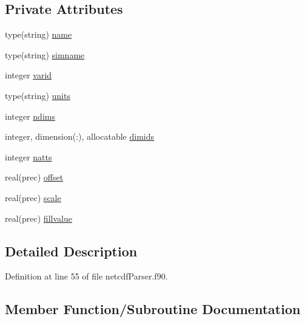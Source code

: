 \subsection*{Private Attributes}
\begin{DoxyCompactItemize}
\item 
type(string) \mbox{\hyperlink{structnetcdfparser__mod_1_1var__t_a86d1bd82de1a8bcd684e0d75cc3d9cc3}{name}}
\item 
type(string) \mbox{\hyperlink{structnetcdfparser__mod_1_1var__t_af5ea209bf909357b775640ad4e9e43d3}{simname}}
\item 
integer \mbox{\hyperlink{structnetcdfparser__mod_1_1var__t_af3b333b148f6159bade3f9263c03892e}{varid}}
\item 
type(string) \mbox{\hyperlink{structnetcdfparser__mod_1_1var__t_ac7b0d52ef17496213c66b5a34dc8f8b6}{units}}
\item 
integer \mbox{\hyperlink{structnetcdfparser__mod_1_1var__t_a1aef5b6886c1e1cbb6714745dfd8d2aa}{ndims}}
\item 
integer, dimension(\+:), allocatable \mbox{\hyperlink{structnetcdfparser__mod_1_1var__t_a1bb991339dd3410a02d8e36a70672e61}{dimids}}
\item 
integer \mbox{\hyperlink{structnetcdfparser__mod_1_1var__t_aeae7353a3f58ee5efac21563a56b41ac}{natts}}
\item 
real(prec) \mbox{\hyperlink{structnetcdfparser__mod_1_1var__t_a04d38d90fee93b81da854bd218df23a1}{offset}}
\item 
real(prec) \mbox{\hyperlink{structnetcdfparser__mod_1_1var__t_a11a2f51aa328c9c0387b543f3a5c2485}{scale}}
\item 
real(prec) \mbox{\hyperlink{structnetcdfparser__mod_1_1var__t_a8e89e092236a61f096a44ad123d4d35e}{fillvalue}}
\end{DoxyCompactItemize}


\subsection{Detailed Description}


Definition at line 55 of file netcdf\+Parser.\+f90.



\subsection{Member Function/\+Subroutine Documentation}
\mbox{\label{structnetcdfparser__mod_1_1var__t_a0cd9a195dc76bda0993ee246474e9b08}} 
